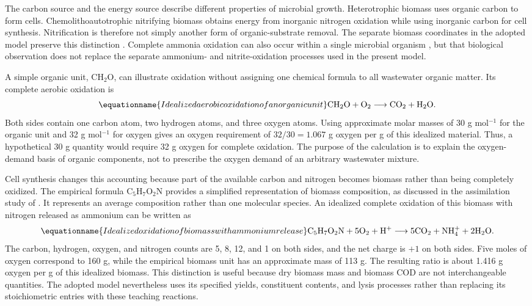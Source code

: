 The carbon source and the energy source describe different properties of microbial growth. Heterotrophic biomass uses organic carbon to form cells. Chemolithoautotrophic nitrifying biomass obtains energy from inorganic nitrogen oxidation while using inorganic carbon for cell synthesis. Nitrification is therefore not simply another form of organic-substrate removal. The separate biomass coordinates in the adopted model preserve this distinction \citep{Henze2006,Guerrero2011}. Complete ammonia oxidation can also occur within a single microbial organism \citep{VanKessel2015}, but that biological observation does not replace the separate ammonium- and nitrite-oxidation processes used in the present model.

A simple organic unit, $\mathrm{CH_2O}$, can illustrate oxidation without assigning one chemical formula to all wastewater organic matter. Its complete aerobic oxidation is
\begin{equation}
\equationname{Idealized aerobic oxidation of an organic unit}
\mathrm{CH_2O}+\mathrm{O_2}\longrightarrow\mathrm{CO_2}+\mathrm{H_2O}.
\label{eq:teaching_carbon_oxidation}
\end{equation}
Both sides contain one carbon atom, two hydrogen atoms, and three oxygen atoms. Using approximate molar masses of 30 g mol$^{-1}$ for the organic unit and 32 g mol$^{-1}$ for oxygen gives an oxygen requirement of $32/30=1.067$ g oxygen per g of this idealized material. Thus, a hypothetical 30 g quantity would require 32 g oxygen for complete oxidation. The purpose of the calculation is to explain the oxygen-demand basis of organic components, not to prescribe the oxygen demand of an arbitrary wastewater mixture.

Cell synthesis changes this accounting because part of the available carbon and nitrogen becomes biomass rather than being completely oxidized. The empirical formula $\mathrm{C_5H_7O_2N}$ provides a simplified representation of biomass composition, as discussed in the assimilation study of \citet{Hoover1952}. It represents an average composition rather than one molecular species. An idealized complete oxidation of this biomass with nitrogen released as ammonium can be written as
\begin{equation}
\equationname{Idealized oxidation of biomass with ammonium release}
\mathrm{C_5H_7O_2N}+5\mathrm{O_2}+\mathrm{H^+}
\longrightarrow5\mathrm{CO_2}+\mathrm{NH_4^+}+2\mathrm{H_2O}.
\label{eq:teaching_biomass_oxidation}
\end{equation}
The carbon, hydrogen, oxygen, and nitrogen counts are 5, 8, 12, and 1 on both sides, and the net charge is $+1$ on both sides. Five moles of oxygen correspond to 160 g, while the empirical biomass unit has an approximate mass of 113 g. The resulting ratio is about 1.416 g oxygen per g of this idealized biomass. This distinction is useful because dry biomass mass and biomass COD are not interchangeable quantities. The adopted model nevertheless uses its specified yields, constituent contents, and lysis processes rather than replacing its stoichiometric entries with these teaching reactions.

